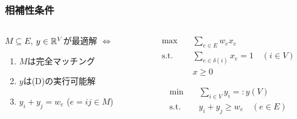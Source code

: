 \documentclass[14pt,aspectratio=169,xcolor=dvipsnames,table,onlytextwidth,dvipdfmx]{beamer}
\begin{document}
\begin{frame}
    \frametitle{相補性条件}

    \begin{columns}[T]
    \begin{column}{.6\textwidth}
        \begin{lemma}[相補性条件]
        $M \subseteq E$, $y \in \mathbb{R}^V$が最適解 
        $\iff$
        \begin{enumerate}
            \item $M$は完全マッチング
            \item $y$は(D)の実行可能解
            \item $y_i + y_j = w_e$ \quad ($e = ij \in M$)
        \end{enumerate}
        \end{lemma}
        
    \end{column}
    \begin{column}{.35\textwidth}
        \footnotesize
        \begin{primal}
        \begin{alignat*}{2}
            \text{max} & \quad  \sum_{e \in E} w_e x_e \\
            \text{s.t.} & \quad \sum_{e \in \delta(i)} x_e = 1  \quad (i \in V) \\
            & \quad x \geq 0 
        \end{alignat*}
    \end{primal}
    \begin{dual}
        \setlength{\abovedisplayskip}{0pt}
        \begin{alignat*}{2}
            \text{min} & \quad  \sum_{i \in V} y_i =: y(V) \\
            \text{s.t.} & \quad y_i + y_j \geq w_e \quad (e \in E) 
        \end{alignat*}
    \end{dual}
    \end{column}
    \end{columns}

\end{frame}
\end{document}
